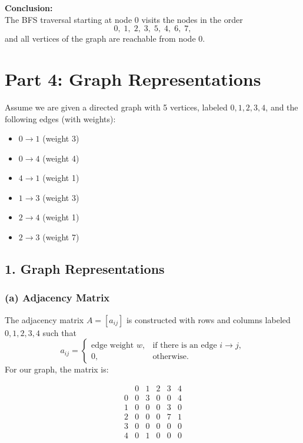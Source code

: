 \documentclass[11pt]{article}
\begin{document}
\textbf{Conclusion:} \\
The BFS traversal starting at node 0 visits the nodes in the order
\[
    \boxed{0,\; 1,\; 2,\; 3,\; 5,\; 4,\; 6,\; 7,}
\]
and all vertices of the graph are reachable from node 0.


\section{Part 4: Graph Representations}

Assume we are given a directed graph with 5 vertices, labeled \(0,1,2,3,4\), and the following edges (with weights):

\begin{itemize}
    \item \(0 \to 1\) (weight 3)
    \item \(0 \to 4\) (weight 4)
    \item \(4 \to 1\) (weight 1)
    \item \(1 \to 3\) (weight 3)
    \item \(2 \to 4\) (weight 1)
    \item \(2 \to 3\) (weight 7)
\end{itemize}



\subsection*{1. Graph Representations}

\subsubsection*{(a) Adjacency Matrix}

The adjacency matrix \(A = [a_{ij}]\) is constructed with rows and columns labeled \(0,1,2,3,4\) such that
\[
    a_{ij}=\begin{cases}
        \text{edge weight } w, & \text{if there is an edge } i \to j, \\
        0,                     & \text{otherwise.}
    \end{cases}
\]
For our graph, the matrix is:

\[
    \begin{array}{c|ccccc}
          & 0 & 1 & 2 & 3 & 4 \\ \hline
        0 & 0 & 3 & 0 & 0 & 4 \\
        1 & 0 & 0 & 0 & 3 & 0 \\
        2 & 0 & 0 & 0 & 7 & 1 \\
        3 & 0 & 0 & 0 & 0 & 0 \\
        4 & 0 & 1 & 0 & 0 & 0 \\
    \end{array}
\]
\end{document}
